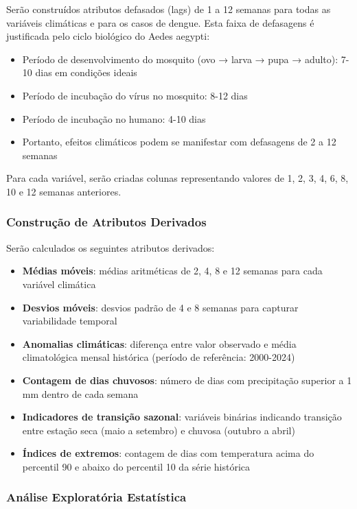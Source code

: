 Serão construídos atributos defasados (lags) de 1 a 12 semanas para todas as variáveis climáticas e para os casos de dengue. Esta faixa de defasagens é justificada pelo ciclo biológico do Aedes aegypti:
\begin{itemize}
    \item Período de desenvolvimento do mosquito (ovo → larva → pupa → adulto): 7-10 dias em condições ideais
    \item Período de incubação do vírus no mosquito: 8-12 dias
    \item Período de incubação no humano: 4-10 dias
    \item Portanto, efeitos climáticos podem se manifestar com defasagens de 2 a 12 semanas
\end{itemize}

Para cada variável, serão criadas colunas representando valores de 1, 2, 3, 4, 6, 8, 10 e 12 semanas anteriores.

\subsubsection{Construção de Atributos Derivados}

Serão calculados os seguintes atributos derivados:

\begin{itemize}
    \item \textbf{Médias móveis}: médias aritméticas de 2, 4, 8 e 12 semanas para cada variável climática
    \item \textbf{Desvios móveis}: desvios padrão de 4 e 8 semanas para capturar variabilidade temporal
    \item \textbf{Anomalias climáticas}: diferença entre valor observado e média climatológica mensal histórica (período de referência: 2000-2024)
    \item \textbf{Contagem de dias chuvosos}: número de dias com precipitação superior a 1 mm dentro de cada semana
    \item \textbf{Indicadores de transição sazonal}: variáveis binárias indicando transição entre estação seca (maio a setembro) e chuvosa (outubro a abril)
    \item \textbf{Índices de extremos}: contagem de dias com temperatura acima do percentil 90 e abaixo do percentil 10 da série histórica
\end{itemize}

\subsubsection{Análise Exploratória Estatística}

